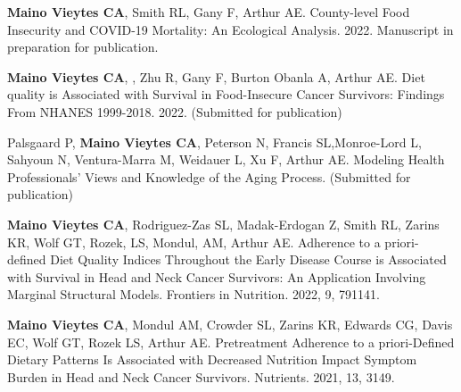 




\begin{cvskills}

  \cvskill
    {} %
    {\textbf{Maino Vieytes CA}, Smith RL, Gany F, Arthur AE. County-level Food Insecurity and COVID-19 Mortality: An Ecological Analysis. 2022. Manuscript in preparation for publication.} %


  
  \cvskill
    {} %
    {\textbf{Maino Vieytes CA}, , Zhu R, Gany F, Burton Obanla A, Arthur AE. Diet quality is Associated with Survival in Food-Insecure Cancer Survivors: Findings From NHANES 1999-2018. 2022. (Submitted for publication)} %



  \cvskill
    {} %
    {Palsgaard P, \textbf{Maino Vieytes CA}, Peterson N, Francis SL,Monroe-Lord L, Sahyoun N, Ventura-Marra M, Weidauer L, Xu F, Arthur AE. Modeling Health Professionals' Views and Knowledge of the Aging Process. (Submitted for publication)} %



  \cvskill
    {} %
    {\textbf{Maino Vieytes CA}, Rodriguez-Zas SL, Madak-Erdogan Z, Smith RL, Zarins KR, Wolf GT, Rozek, LS, Mondul, AM, Arthur AE. Adherence to a priori-defined Diet Quality Indices Throughout the Early Disease Course is Associated with Survival in Head and Neck Cancer Survivors: An Application Involving Marginal Structural Models. Frontiers in Nutrition. 2022, 9, 791141.} %



  \cvskill
    {} %
    {\textbf{Maino Vieytes CA}, Mondul AM, Crowder SL, Zarins KR, Edwards CG, Davis EC, Wolf GT, Rozek LS, Arthur AE. Pretreatment Adherence to a priori-Defined Dietary Patterns Is Associated with Decreased Nutrition Impact Symptom Burden in Head and Neck Cancer Survivors. Nutrients. 2021, 13, 3149.} %



\end{cvskills}
